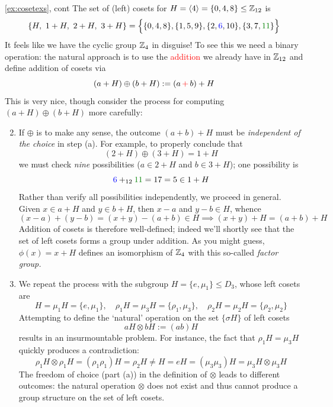 \begin{examples*}{\ref{ex:cosetexs}, cont}{}
	\exstart The set of (left) cosets for $H=\left\langle 4\right\rangle=\{0,4,8\}\le\mathbb{Z}_{12}$ is
	\[
		\{H,\ 1+H,\ 2+H,\ 3+H\}
		=\Bigl\{
			\{0,4,8\},\{1,5,9\}, \{2,\textcolor{blue}{6},10\}, \{3,7,\textcolor{Green}{11}\}
		\Bigr\}
	\]
	It feels like we have the cyclic group $\mathbb{Z}_4$ in disguise! To see this we need a binary operation: the natural approach is to use the \textcolor{red}{addition} we already have in $\mathbb{Z}_{12}$ and define addition of cosets via
	\[
		(a+H)\oplus(b+H):=(a\operatorname{\textcolor{red}{+}}b)+H
	\]
	This is very nice, though consider the process for computing $(a+H)\oplus(b+H)$ more carefully:\vspace{-2pt}
	\begin{enumerate}\setcounter{enumi}{1}
	  \item[]
		If $\oplus$ is to make any sense, the outcome $(a+b)+H$ must be \emph{independent of the choice} in step (a). For example, to properly conclude that
		\[
			(2+H)\oplus(3+H)=1+H
		\]
		we must check \emph{nine} possibilities ($a\in 2+H$ and $b\in 3+H$); one possibility is
		\[
			\textcolor{blue}{6}+_{12}\textcolor{Green}{11}=17=5\in 1+H
		\]
		Rather than verify all possibilities independently, we proceed in general. Given $x\in a+H$ and $y\in b+H$, then $x-a$ and $y-b\in H$, whence
		\[
			(x-a)+(y-b)=(x+y)-(a+b)\in H\implies (x+y)+H=(a+b)+H
		\]
		Addition of cosets is therefore well-defined; indeed we'll shortly see that the set of left cosets forms a group under addition. As you might guess, $\phi(x)=x+H$ defines an isomorphism of $\mathbb{Z}_4$ with this so-called \emph{factor group.}
	
		\item We repeat the process with the subgroup $H=\{e,\mu_1\}\le D_3$, whose left cosets are
		\[
			H=\mu_1H=\{e,\mu_1\},\quad
			\rho_1H=\mu_3H=\{\rho_1,\mu_3\},\quad
			\rho_2H=\mu_2H=\{\rho_2,\mu_2\}
		\]
		Attempting to define the `natural' operation on the set $\{\sigma H\}$ of left cosets
		\[
			aH\otimes bH:=(ab)H
		\]
		results in an insurmountable problem. For instance, the fact that $\rho_1H=\mu_3H$ quickly produces a contradiction:
		\[
			\rho_1H\otimes\rho_1H =(\rho_1\rho_1)H =\rho_2H
			\neq H =eH =(\mu_3\mu_3)H =\mu_3H\otimes \mu_3H
		\]
		The freedom of choice (part (a)) in the definition of $\otimes$ leads to different outcomes: the natural operation $\otimes$ does not exist and thus cannot produce a group structure on the set of left cosets.
	\end{enumerate}
\end{examples*}



